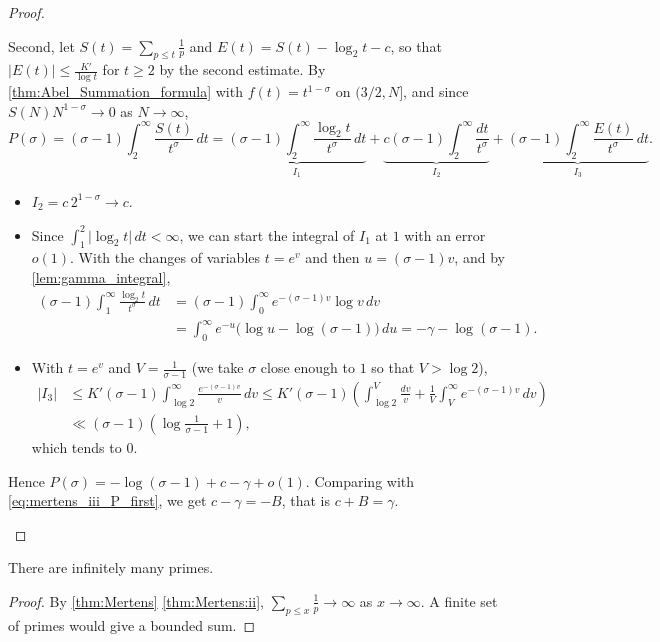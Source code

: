 \begin{proof}
\begin{enumerate}[label={\upshape\roman*)}]
            Second, let $S(t) = \sum_{p\le t}\frac 1p$ and $E(t) = S(t) - \log_2 t - c$, so that $\lvert E(t)\rvert\le \frac{K'}{\log t}$ for $t\ge2$ by the second estimate. By \cref{thm:Abel_Summation_formula} with $f(t) = t^{1-\sigma}$ on $(3/2,N]$, and since $S(N)N^{1-\sigma}\to0$ as $N\to\infty$,
            \begin{equation*}
                P(\sigma) = (\sigma-1)\int_2^\infty\frac{S(t)}{t^\sigma}\,dt = \underbrace{(\sigma-1)\int_2^\infty\frac{\log_2 t}{t^\sigma}\,dt}_{I_1} + \underbrace{c(\sigma-1)\int_2^\infty\frac{dt}{t^\sigma}}_{I_2} + \underbrace{(\sigma-1)\int_2^\infty\frac{E(t)}{t^\sigma}\,dt}_{I_3}.
            \end{equation*}
            \begin{itemize}
                \item $I_2 = c\,2^{1-\sigma}\to c$.
                \item Since $\int_1^2\lvert\log_2 t\rvert\,dt<\infty$, we can start the integral of $I_1$ at $1$ with an error $o(1)$. With the changes of variables $t = e^v$ and then $u = (\sigma-1)v$, and by \cref{lem:gamma_integral},
                    \begin{equation*}
                        \begin{aligned}
                        (\sigma-1)\int_1^\infty\frac{\log_2 t}{t^\sigma}\,dt &= (\sigma-1)\int_0^\infty e^{-(\sigma-1)v}\log v\,dv\\
                        &= \int_0^\infty e^{-u}\big(\log u - \log(\sigma-1)\big)\,du = -\gamma-\log(\sigma-1).
                        \end{aligned}
                    \end{equation*}
                \item With $t = e^v$ and $V = \frac{1}{\sigma-1}$ (we take $\sigma$ close enough to $1$ so that $V>\log 2$),
                    \begin{equation*}
                        \begin{aligned}
                        \lvert I_3\rvert&\le K'(\sigma-1)\int_{\log 2}^\infty\frac{e^{-(\sigma-1)v}}{v}\,dv\le K'(\sigma-1)\left(\int_{\log 2}^{V}\frac{dv}{v} + \frac1V\int_V^\infty e^{-(\sigma-1)v}\,dv\right)\\
                        &\ll (\sigma-1)\left(\log\frac{1}{\sigma-1} + 1\right),
                        \end{aligned}
                    \end{equation*}
                    which tends to $0$.
            \end{itemize}
            Hence $P(\sigma) = -\log(\sigma-1) + c - \gamma + o(1)$. Comparing with \cref{eq:mertens_iii_P_first}, we get $c-\gamma = -B$, that is $c + B = \gamma$.
    \end{enumerate}
\end{proof}

\begin{corollary}
    There are infinitely many primes.
\end{corollary}
\begin{proof}
    By \cref{thm:Mertens} \ref{thm:Mertens:ii}, $\sum_{p\le x}\frac1p\to\infty$ as $x\to\infty$. A finite set of primes would give a bounded sum.
\end{proof}
